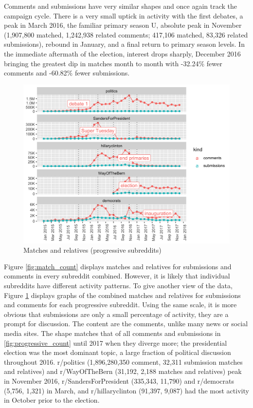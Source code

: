 \documentclass[doublespacing]{utdthesis}
\begin{document}
Comments and submissions have very similar shapes and once again track the campaign cycle.
There is a very small uptick in activity with the first debates, a peak in March 2016, the familiar primary season U, absolute peak in November (1,907,800 matched, 1,242,938 related comments; 417,106 matched, 83,326 related submissions), rebound in January, and a final return to primary season levels.
In the immediate aftermath of the election, interest drops sharply, December 2016 bringing the greatest dip in matches month to month with -32.24\% fewer comments and -60.82\% fewer submissions.

\begin{figure}[!ht]
\centering
\includegraphics[width=\textwidth]{2016/progressive_match}
\caption{Matches and relatives (progressive subreddits)}
\label{fig:progressive_match}
\end{figure}

Figure \ref{fig:match_count} displays matches and relatives for submissions and comments in every subreddit combined.
However, it is likely that individual subreddits have different activity patterns.
To give another view of the data, Figure \ref{fig:progressive_match} displays graphs of the combined matches and relatives for submissions and comments for each progressive subreddit.
Using the same scale, it is more obvious that submissions are only a small percentage of activity, they are a prompt for discussion.
The content are the comments, unlike many news or social media sites.
The shape matches that of all comments and submissions in \ref{fig:progressive_count} until 2017 when they diverge more; the presidential election was the most dominant topic, a large fraction of political discussion throughout 2016.
r/politics (1,896,280,350 comment, 32,311 submission matches and relatives) and r/WayOfTheBern (31,192, 2,188 matches and relatives) peak in November 2016, r/SandersForPresident (335,343, 11,790) and r/democrats (5,756, 1,321) in March, and r/hillaryclinton (91,397, 9,087) had the most activity in October prior to the election. 
\end{document}
